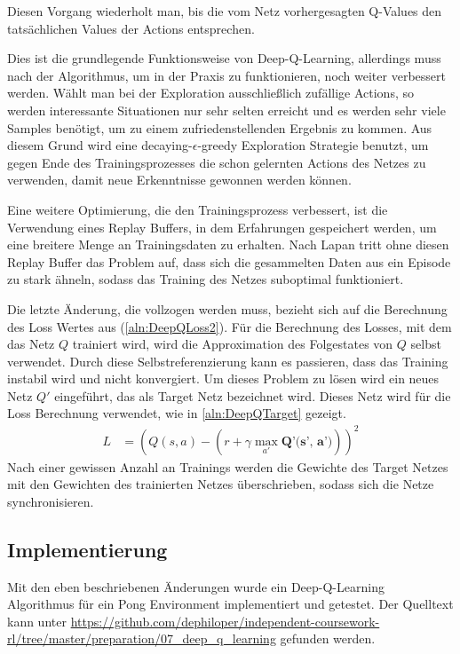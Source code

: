 \documentclass[11pt]{scrartcl}
\begin{document}
Diesen Vorgang wiederholt man, bis die vom Netz vorhergesagten Q-Values den
tat\-säch\-lich\-en Values der Actions entsprechen.

Dies ist die grundlegende Funktionsweise von Deep-Q-Learning, allerdings muss nach
\cite[~S.202]{L2018} der Algorithmus, um in der Praxis zu funktionieren, noch weiter
verbessert werden. Wählt man bei der Exploration ausschließlich zufällige Actions, so
werden interessante Situationen nur sehr selten erreicht und es werden sehr viele Samples
benötigt, um zu einem zufriedenstellenden Ergebnis zu kommen. Aus diesem Grund wird eine
decaying-$\epsilon$-greedy Exploration Strategie benutzt, um gegen Ende des
Trainingsprozesses die schon gelernten Actions des Netzes zu verwenden, damit neue
Erkenntnisse gewonnen werden können.

Eine weitere Optimierung, die den Trainingsprozess verbessert, ist die Verwendung eines
Replay Buffers, in dem Erfahrungen gespeichert werden, um eine breitere Menge an
Trainingsdaten zu erhalten. Nach Lapan \cite{L2018} tritt ohne diesen Replay Buffer das
Problem auf, dass sich die gesammelten Daten aus ein Episode zu stark ähneln, sodass das
Training des Netzes suboptimal funktioniert.

Die letzte Änderung, die vollzogen werden muss, bezieht sich auf die Berechnung des Loss
Wertes aus (\ref{aln:DeepQLoss2}). Für die Berechnung des Losses, mit dem das Netz $Q$
trainiert wird, wird die Approximation des Folgestates von $Q$ selbst verwendet. Durch
diese Selbstreferenzierung kann es passieren, dass das Training instabil wird und nicht
konvergiert. Um dieses Problem zu lösen wird ein neues Netz $Q'$ eingeführt, das als
Target Netz bezeichnet wird. Dieses Netz wird für die Loss Berechnung verwendet, wie in
\ref{aln:DeepQTarget} gezeigt.
\begin{align}
  L & = \left(Q(s, a) - \left(r + \gamma \max_{a'} \textbf{Q'(s', a')}\right)\right)^2
  \label{aln:DeepQTarget}
\end{align}
\noindent
Nach einer gewissen Anzahl an Trainings werden die Gewichte des Target Netzes mit den
Gewichten des trainierten Netzes überschrieben, sodass sich die Netze synchronisieren.

\subsection{Implementierung}
Mit den eben beschriebenen Änderungen wurde ein Deep-Q-Learning Algorithmus für ein Pong
Environment implementiert und getestet. Der Quelltext kann unter
\url{https://github.com/dephiloper/independent-coursework-rl/tree/master/preparation/07_deep_q_learning}
gefunden werden.
\end{document}
